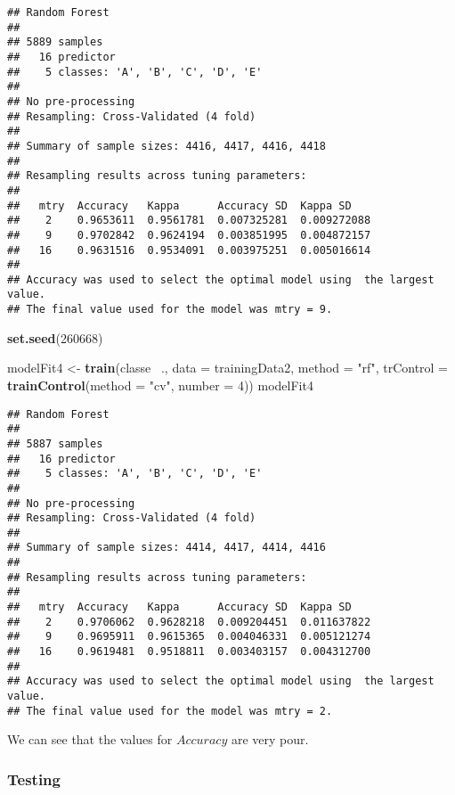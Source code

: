 \documentclass[]{article}
\newenvironment{Shaded}{\begin{snugshade}}{\end{snugshade}}
\newcommand{\KeywordTok}[1]{\textcolor[rgb]{0.13,0.29,0.53}{\textbf{{#1}}}}
\newcommand{\DataTypeTok}[1]{\textcolor[rgb]{0.13,0.29,0.53}{{#1}}}
\newcommand{\DecValTok}[1]{\textcolor[rgb]{0.00,0.00,0.81}{{#1}}}
\newcommand{\StringTok}[1]{\textcolor[rgb]{0.31,0.60,0.02}{{#1}}}
\newcommand{\NormalTok}[1]{{#1}}
\begin{document}
\begin{verbatim}
## Random Forest 
## 
## 5889 samples
##   16 predictor
##    5 classes: 'A', 'B', 'C', 'D', 'E' 
## 
## No pre-processing
## Resampling: Cross-Validated (4 fold) 
## 
## Summary of sample sizes: 4416, 4417, 4416, 4418 
## 
## Resampling results across tuning parameters:
## 
##   mtry  Accuracy   Kappa      Accuracy SD  Kappa SD   
##    2    0.9653611  0.9561781  0.007325281  0.009272088
##    9    0.9702842  0.9624194  0.003851995  0.004872157
##   16    0.9631516  0.9534091  0.003975251  0.005016614
## 
## Accuracy was used to select the optimal model using  the largest value.
## The final value used for the model was mtry = 9.
\end{verbatim}

\begin{Shaded}
\begin{Highlighting}[]
\KeywordTok{set.seed}\NormalTok{(}\DecValTok{260668}\NormalTok{)}

\NormalTok{modelFit4 <-}\StringTok{ }\KeywordTok{train}\NormalTok{(classe ~., }\DataTypeTok{data =} \NormalTok{trainingData2,}
                  \DataTypeTok{method =} \StringTok{"rf"}\NormalTok{,}
                  \DataTypeTok{trControl =} \KeywordTok{trainControl}\NormalTok{(}\DataTypeTok{method =} \StringTok{"cv"}\NormalTok{, }\DataTypeTok{number =} \DecValTok{4}\NormalTok{))}
\NormalTok{modelFit4}
\end{Highlighting}
\end{Shaded}

\begin{verbatim}
## Random Forest 
## 
## 5887 samples
##   16 predictor
##    5 classes: 'A', 'B', 'C', 'D', 'E' 
## 
## No pre-processing
## Resampling: Cross-Validated (4 fold) 
## 
## Summary of sample sizes: 4414, 4417, 4414, 4416 
## 
## Resampling results across tuning parameters:
## 
##   mtry  Accuracy   Kappa      Accuracy SD  Kappa SD   
##    2    0.9706062  0.9628218  0.009204451  0.011637822
##    9    0.9695911  0.9615365  0.004046331  0.005121274
##   16    0.9619481  0.9518811  0.003403157  0.004312700
## 
## Accuracy was used to select the optimal model using  the largest value.
## The final value used for the model was mtry = 2.
\end{verbatim}

We can see that the values for \(Accuracy\) are very pour.

\subsubsection{Testing}\label{testing-1}
\end{document}
